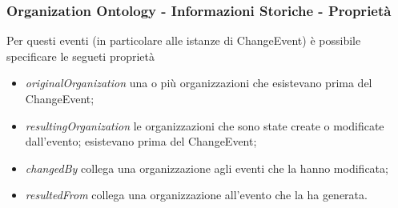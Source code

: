 \documentclass[8pt]{beamer}
\begin{document}
\begin{frame}
  \frametitle{Organization Ontology - Informazioni Storiche - Propriet\`a}
  Per questi eventi (in particolare alle istanze di ChangeEvent) \`e possibile specificare 
  le segueti propriet\`a
  \begin{itemize}[<+->]
   \item \emph{originalOrganization} una o pi\`u organizzazioni che esistevano prima del ChangeEvent;
   \item \emph{resultingOrganization} le organizzazioni che sono state create o modificate dall'evento;
   esistevano prima del ChangeEvent;
   \item \emph{changedBy} collega una organizzazione agli eventi che la hanno modificata;
   \item \emph{resultedFrom} collega una organizzazione all'evento che la ha generata.
  \end{itemize}
\end{frame}
\end{document}

